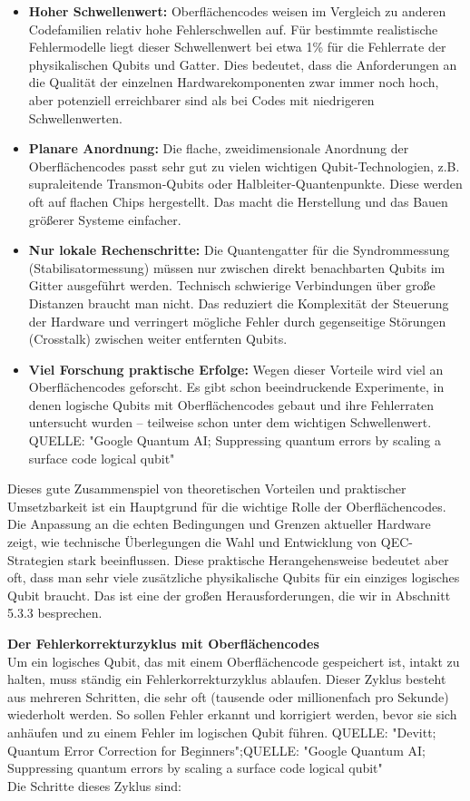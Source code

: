 \begin{itemize}
    \item \textbf{Hoher Schwellenwert:} Oberflächencodes weisen im Vergleich zu anderen Codefamilien relativ hohe Fehlerschwellen auf. Für bestimmte realistische Fehlermodelle liegt dieser Schwellenwert bei etwa 1\% für die Fehlerrate der physikalischen Qubits und Gatter. Dies bedeutet, dass die Anforderungen an die Qualität der einzelnen Hardwarekomponenten zwar immer noch hoch, aber potenziell erreichbarer sind als bei Codes mit niedrigeren Schwellenwerten.\cite{fowler_surface_2012}
    \item \textbf{Planare Anordnung:} Die flache, zweidimensionale Anordnung der Oberflächencodes passt sehr gut zu vielen wichtigen Qubit-Technologien, z.B. supraleitende Transmon-Qubits oder Halbleiter-Quantenpunkte. Diese werden oft auf flachen Chips hergestellt. Das macht die Herstellung und das Bauen größerer Systeme einfacher.\cite{fowler_surface_2012}
    \item \textbf{Nur lokale Rechenschritte:} Die Quantengatter für die Syndrommessung (Stabilisatormessung) müssen nur zwischen direkt benachbarten Qubits im Gitter ausgeführt werden. Technisch schwierige Verbindungen über große Distanzen braucht man nicht. Das reduziert die Komplexität der Steuerung der Hardware und verringert mögliche Fehler durch gegenseitige Störungen (Crosstalk) zwischen weiter entfernten Qubits.\cite{fowler_surface_2012}
    \item \textbf{Viel Forschung praktische Erfolge:} Wegen dieser Vorteile wird viel an Oberflächencodes geforscht. Es gibt schon beeindruckende Experimente, in denen logische Qubits mit Oberflächencodes gebaut und ihre Fehlerraten untersucht wurden – teilweise schon unter dem wichtigen Schwellenwert. QUELLE: "Google Quantum AI; Suppressing quantum errors by scaling a surface code logical qubit"
\end{itemize}
Dieses gute Zusammenspiel von theoretischen Vorteilen und praktischer Umsetzbarkeit ist ein Hauptgrund für die wichtige Rolle der Oberflächencodes. Die Anpassung an die echten Bedingungen und Grenzen aktueller Hardware zeigt, wie technische Überlegungen die Wahl und Entwicklung von QEC-Strategien stark beeinflussen. Diese praktische Herangehensweise bedeutet aber oft, dass man sehr viele zusätzliche physikalische Qubits für ein einziges logisches Qubit braucht. Das ist eine der großen Herausforderungen, die wir in Abschnitt 5.3.3 besprechen.

\textbf{Der Fehlerkorrekturzyklus mit Oberflächencodes}
\\
Um ein logisches Qubit, das mit einem Oberflächencode gespeichert ist, intakt zu halten, muss ständig ein Fehlerkorrekturzyklus ablaufen. Dieser Zyklus besteht aus mehreren Schritten, die sehr oft (tausende oder millionenfach pro Sekunde) wiederholt werden. So sollen Fehler erkannt und korrigiert werden, bevor sie sich anhäufen und zu einem Fehler im logischen Qubit führen. QUELLE: "Devitt; Quantum Error Correction for Beginners";QUELLE: "Google Quantum AI; Suppressing quantum errors by scaling a surface code logical qubit"
\\
Die Schritte dieses Zyklus sind:

